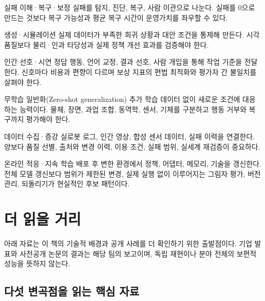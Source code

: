 \documentclass[11pt,openany]{book}
\begin{document}
\begin{termcard}{실패 이해·복구·보정}
실패를 탐지, 진단, 복구, 사람 이관으로 나눈다. 실패를 0으로 만드는 것보다 복구 가능성과 평균 복구 시간이 운영가치를 좌우할 수 있다.
\end{termcard}

\begin{termcard}{생성·시뮬레이션}
실제 데이터가 부족한 희귀 상황과 대안 조건을 통제해 만든다. 시각 품질보다 물리·인과 타당성과 실제 정책 개선 효과를 검증해야 한다.
\end{termcard}

\begin{termcard}{인간 선호·시연}
정답 행동, 언어 교정, 결과 선호, 사람 개입을 통해 작업 기준을 전달한다. 신호마다 비용과 편향이 다르며 보상 지표의 편법 최적화와 평가자 간 불일치를 살펴야 한다.
\end{termcard}

\begin{termcard}{무학습 일반화(Zero-shot generalization)}
추가 학습 데이터 없이 새로운 조건에 대응하는 능력이다. 물체, 장면, 과업 조합, 동역학, 센서, 기체를 구분하고 행동 거부와 복구까지 평가해야 한다.
\end{termcard}

\begin{termcard}{데이터 수집·증강}
실로봇 로그, 인간 영상, 합성 센서 데이터, 실패 이력을 연결한다. 양보다 품질 선별, 출처와 변경 이력, 이용 조건, 실패 범위, 실세계 재검증이 중요하다.
\end{termcard}

\begin{termcard}{온라인 적응·지속 학습}
배포 후 변한 환경에서 정책, 어댑터, 메모리, 기술을 갱신한다. 전체 모델 갱신보다 범위가 제한된 변경, 실제 실행 없이 이루어지는 그림자 평가, 버전 관리, 되돌리기가 현실적인 후보 패턴이다.
\end{termcard}

\cleardoublepage
\backmatter
\chapter*{더 읽을 거리}

아래 자료는 이 책의 기술적 배경과 공개 사례를 더 확인하기 위한 출발점이다. 기업 발표와 사전공개 논문의 결과는 해당 팀의 보고이며, 독립 재현이나 분야 전체의 보편적 성능을 뜻하지 않는다.

\section*{다섯 변곡점을 읽는 핵심 자료}
\end{document}
